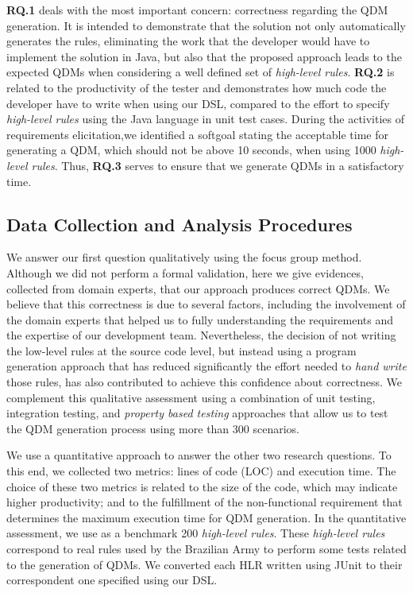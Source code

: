 \documentclass[AMA,STIX1COL]{WileyNJD-v2}
\newcommand{\callers}{\emph{high-level rules}\xspace}
\newcommand{\shc}{HLR\xspace}
\begin{document}
\textbf{RQ.1} deals with the most important concern: correctness regarding the QDM generation. It is intended to demonstrate that the solution not only automatically generates the rules, eliminating the work that the developer would have to implement the solution in Java, but also that the proposed approach leads to the expected QDMs when considering a well defined set of \callers. \textbf{RQ.2} is related to the productivity of the tester and demonstrates how much code the developer have to write when using our DSL, compared to the effort to specify \callers using the Java language in unit test cases. During the activities of requirements elicitation,we identified a softgoal stating the  acceptable time for generating a QDM, which should not be above 10 seconds, when using 1000 \callers. Thus, \textbf{RQ.3} serves to ensure that we generate QDMs in a satisfactory time.



\subsection{Data Collection and Analysis Procedures}

We answer our first question qualitatively using the focus group method. Although
we did not perform a formal validation, here we give evidences, collected from domain experts, that our approach produces correct QDMs. We believe that this correctness is due to several factors, including the involvement of the domain experts that helped us to fully understanding the requirements and the expertise of our development team. Nevertheless, the decision of not writing the low-level rules at the source code level, but instead using a program generation approach that has reduced significantly the effort needed to \emph{hand write} those rules, has also contributed to achieve this confidence about correctness. We complement this qualitative
assessment using a combination of unit testing, integration testing, and
\emph{property based testing} approaches that allow us to
test the QDM generation process using more than 300 scenarios. 

We use a quantitative approach to answer the other two research questions.
To this end, we collected two metrics: lines of code (LOC) and execution time. The choice of these two metrics is related to the size of the code, which may indicate higher productivity; and to the fulfillment of the non-functional requirement that determines the maximum execution time for QDM generation. In the quantitative assessment, we use as a benchmark 200 \callers. These \callers correspond to real rules used by the Brazilian Army to perform some tests related to the generation of QDMs. We converted each \shc written using JUnit to their correspondent one specified using our DSL.
\end{document}
